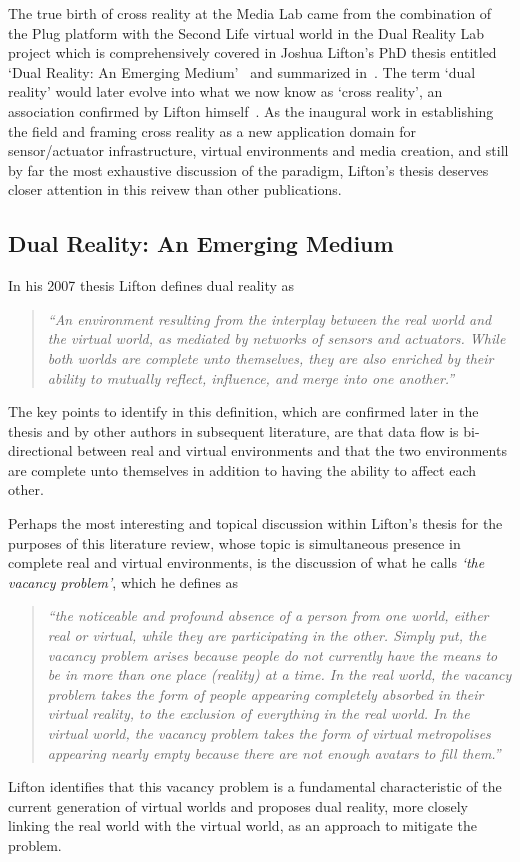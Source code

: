 The true birth of cross reality at the Media Lab came from the combination of the Plug platform with the Second Life virtual world in the Dual Reality Lab project which is comprehensively covered in Joshua Lifton's PhD thesis entitled `Dual Reality: An Emerging Medium'~\cite{Lifton2007a} and summarized in~\cite{lifton:merging}. The term `dual reality' would later evolve into what we now know as `cross reality', an association confirmed by Lifton himself~\cite{lifton:adoption}. As the inaugural work in establishing the field and framing cross reality as a new application domain for sensor/actuator infrastructure, virtual environments and media creation, and still by far the most exhaustive discussion of the paradigm, Lifton's thesis deserves closer attention in this reivew than other publications.

\subsection{Dual Reality: An Emerging Medium}
\label{subsec:dual_reality_:_an_emerging_medium}
In his 2007 thesis Lifton defines dual reality as
\begin{quote}
\textit{``An environment resulting from the interplay between the real world and the virtual world, as mediated by networks of sensors and actuators. While both worlds are complete unto themselves, they are also enriched by their ability to mutually reflect, influence, and merge into one another.''}~\cite{Lifton2007a}
\end{quote}
The key points to identify in this definition, which are confirmed later in the thesis and by other authors in subsequent literature, are that data flow is bi-directional between real and virtual environments and that the two environments are complete unto themselves in addition to having the ability to affect each other.

Perhaps the most interesting and topical discussion within Lifton's thesis for the purposes of this literature review, whose topic is simultaneous presence in complete real and virtual environments, is the discussion of what he calls \textit{`the vacancy problem'}, which he defines as
\begin{quote}
\textit{``the noticeable and profound absence of a person from one world, either real or virtual, while they are participating in the other. Simply put, the vacancy problem arises because people do not currently have the means to be in more than one place (reality) at a time. In the real world, the vacancy problem takes the form of people appearing completely absorbed in their virtual reality, to the exclusion of everything in the real world. In the virtual world, the vacancy problem takes the form of virtual metropolises appearing nearly empty because there are not enough avatars to fill them.''}
\end{quote}
Lifton identifies that this vacancy problem is a fundamental characteristic of the current generation of virtual worlds and proposes dual reality, more closely linking the real world with the virtual world, as an approach to mitigate the problem.

